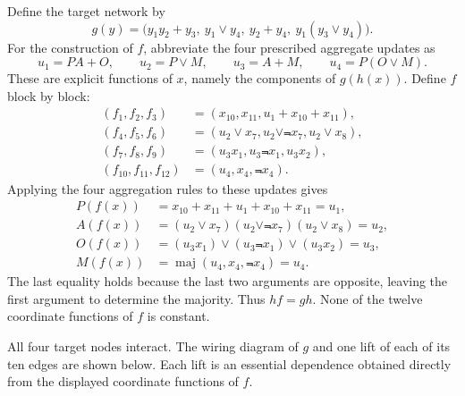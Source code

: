 \begin{example}
    Define the target network by
    \begin{equation}\label{eq:four-node-aggregate-network}
        g(y)=\bigl(y_1y_2+y_3,\ y_1\vee y_4,\ y_2+y_4,
                    \ y_1(y_3\vee y_4)\bigr).
    \end{equation}
    For the construction of $f$, abbreviate the four prescribed aggregate updates as
    \[
        u_1=PA+O,\qquad u_2=P\vee M,\qquad
        u_3=A+M,\qquad u_4=P(O\vee M).
    \]
    These are explicit functions of $x$, namely the components of $g(h(x))$. Define $f$ block by block:
    \begin{align*}
        (f_1,f_2,f_3)&=(x_{10},x_{11},u_1+x_{10}+x_{11}),\\
        (f_4,f_5,f_6)&=(u_2\vee x_7,u_2\vee\Not{x}_7,u_2\vee x_8),\\
        (f_7,f_8,f_9)&=(u_3x_1,u_3\Not{x}_1,u_3x_2),\\
        (f_{10},f_{11},f_{12})&=(u_4,x_4,\Not{x}_4).
    \end{align*}
    Applying the four aggregation rules to these updates gives
    \begin{align*}
        P(f(x))&=x_{10}+x_{11}+u_1+x_{10}+x_{11}=u_1,\\
        A(f(x))&=(u_2\vee x_7)(u_2\vee\Not{x}_7)(u_2\vee x_8)=u_2,\\
        O(f(x))&=(u_3x_1)\vee(u_3\Not{x}_1)\vee(u_3x_2)=u_3,\\
        M(f(x))&=\operatorname{maj}(u_4,x_4,\Not{x}_4)=u_4.
    \end{align*}
    The last equality holds because the last two arguments are opposite, leaving the first argument to determine the majority. Thus $hf=gh$. None of the twelve coordinate functions of $f$ is constant.

    All four target nodes interact. The wiring diagram of $g$ and one lift of each of its ten edges are shown below. Each lift is an essential dependence obtained directly from the displayed coordinate functions of $f$.
    \begin{center}
        \begin{minipage}{0.45\linewidth}
            \centering


\end{minipage}
\end{center}
\end{example}
